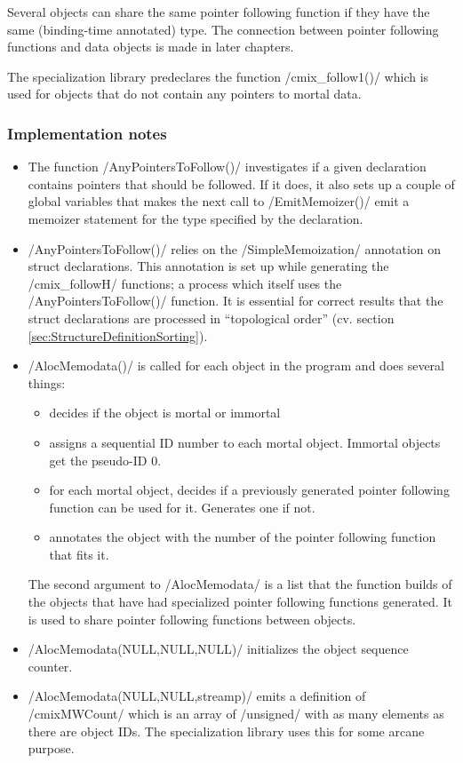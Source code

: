 \begin{docpart}
Several objects can share the same pointer following function if they
have the same (binding-time annotated) type. The connection between
pointer following functions and data objects is made in later
chapters.

The specialization library predeclares the function /cmix_follow1()/
which is used for objects that do not contain any pointers to mortal
data.

\subsubsection{Implementation notes}
\begin{itemize}
\item The function /AnyPointersToFollow()/ investigates if a given
	declaration contains pointers that should be followed. If
	it does, it also sets up a couple of global variables that
	makes the next call to /EmitMemoizer()/ emit a memoizer
	statement for the type specified by the declaration.
\item /AnyPointersToFollow()/ relies on the /SimpleMemoization/
	annotation on struct declarations. This annotation is
	set up while generating the /cmix_followH/ functions;
	a process which itself uses the /AnyPointersToFollow()/
	function. It is essential for correct results that the
	struct declarations are processed in ``topological order''
	(cv. section \ref{sec:StructureDefinitionSorting}).
\item /AlocMemodata()/ is called for each object in the program
	and does several things:
	\begin{itemize}
	\item decides if the object is mortal or immortal
	\item assigns a sequential ID number to each mortal object.
		Immortal objects get the pseudo-ID 0.
	\item for each mortal object, decides if a previously
		generated pointer following function can be used for
		it. Generates one if not.
	\item annotates the object with the number of the pointer
		following function that fits it.
	\end{itemize}
	The second argument to /AlocMemodata/ is a list that the
	function builds of the objects that have had specialized
	pointer following functions generated. It is used to share
	pointer following functions between objects.
\item /AlocMemodata(NULL,NULL,NULL)/ initializes the object
	sequence counter.
\item /AlocMemodata(NULL,NULL,streamp)/ emits a definition of
	/cmixMWCount/ which is an array of /unsigned/ with as many
	elements as there are object IDs. The specialization
	library uses this for some arcane purpose.
\end{itemize}



\end{docpart}
